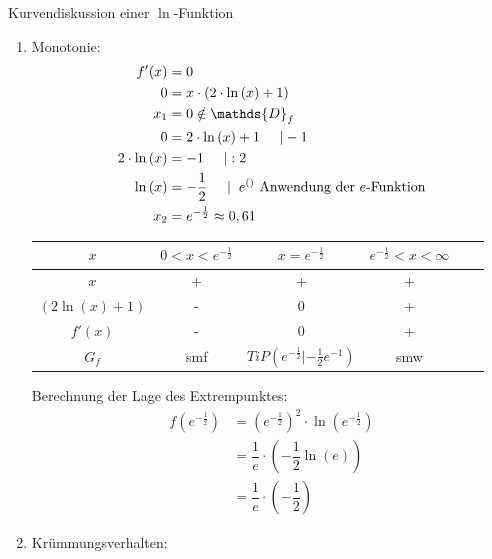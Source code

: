 \begin{bsp}{Kurvendiskussion einer $\ln$-Funktion}{ }
\begin{enumerate}
\item Monotonie:
        \begin{equation*}
            \begin{split}
                f'(x)&=0\\
               0&= x\cdot (2\cdot\ln{(x)} +1)\\
                x_1&= 0 \notin \mathds{D}_f\\
                0&= 2\cdot\ln{(x)} +1 \hspace{0.5cm} | -1\\
                 2\cdot\ln{(x)}&= -1 \hspace{0.5cm} | :2\\
                \ln{(x)}&= -\frac{1}{2} \hspace{0.5cm} |\hspace{0.2cm} e^{()} \text{ Anwendung der $e$-Funktion}\\
                x_2&= e^{-\frac{1}{2}}\approx 0,61
            \end{split}
        \end{equation*}
\begin{center}\begin{tabular}{||c|c|c|c|c|c||}
    \hline
    $x$& $ 0<x<e^{-\frac{1}{2}} $ & $ x =e^{-\frac{1}{2}}$ &$ e^{-\frac{1}{2}}<x<\infty $ \\
    \hline \hline
    $x$ & + & + & +   \\
    \hline
    $(2\ln{(x)}+1)$ & - & 0 & +  \\
     \hline
    $f'(x)$ & - & 0 & + \\ 
    \hline
    \hline
    $G_f$ & smf & $TiP(e^{-\frac{1}{2}}|-\frac{1}{2} e^{-1})$ & smw  \\
    \hline
\end{tabular}
\end{center}
Berechnung der Lage des Extrempunktes:
        \begin{equation*}
            \begin{split}
               f(e^{-\frac{1}{2}}) &= (e^{-\frac{1}{2}})^2 \cdot \ln{(e^{-\frac{1}{2}})}\\
               &= \dfrac{1}{e} \cdot\left( -\dfrac{1}{2} \ln{(e)}\right)\\
                &= \dfrac{1}{e} \cdot \left(-\dfrac{1}{2}\right)
            \end{split}
        \end{equation*}
        \item Krümmungsverhalten:
        \begin{equation*}

\end{equation*}
\end{enumerate}
\end{bsp}
